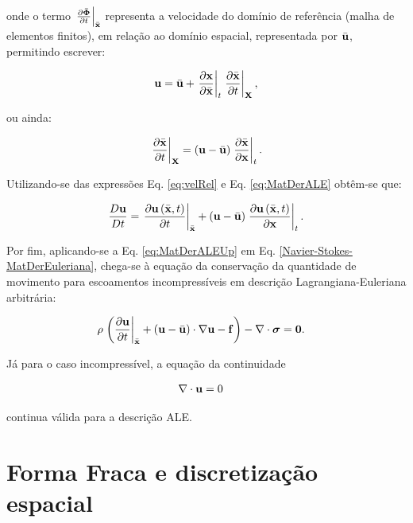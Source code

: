 \documentclass[tese_patricia]{subfiles}%
\begin{document}
\noindent onde o termo $\left. \frac{\partial \bar{\mathbf{\Phi}}}{\partial t} \right|_{\bar{\mathbf{x}}}$ representa a velocidade do domínio de referência (malha de elementos finitos), em relação ao domínio espacial, representada por $\bar{\mathbf{u}}$, permitindo escrever: 

\begin{align}
\mathbf{u} = \bar{\mathbf{u}} + \left . \frac{\partial \mathbf{x}}{\partial \bar{\mathbf{x}}} \right|_{t} \left . \frac{\partial \bar{\mathbf{x}}}{\partial t} \right|_{\mathbf{X}},
\end{align}

\noindent ou ainda:

\begin{align}
\left . \frac{\partial \bar{\mathbf{x}}}{\partial t} \right|_{\mathbf{X}} = \left( \mathbf{u} - \bar{\mathbf{u}} \right) \left. \frac{\partial \bar{\mathbf{x}}}{\partial \mathbf{x}} \right |_{t}. \label{eq:velRel}
 \end{align}
 
Utilizando-se das expressões Eq. \eqref{eq:velRel} e Eq. \eqref{eq:MatDerALE} obtêm-se que: 
 
\begin{align}
\frac{D\mathbf{u}}{Dt} = \left. \frac{\partial\mathbf{u}\left(\bar{\mathbf{x}},t\right)}{\partial t} \right|_{\bar{\mathbf{x}}} +  \left( \mathbf{u} - \bar{\mathbf{u}} \right) \left. \frac{\partial\mathbf{u}\left(\bar{\mathbf{x}},t\right)}{\partial \mathbf{x}} \right|_{t}. \label{eq:MatDerALEUp}
\end{align}

Por fim, aplicando-se a Eq. \eqref{eq:MatDerALEUp} em Eq. \ref{Navier-Stokes-MatDerEuleriana}, chega-se à equação da conservação da quantidade de movimento para escoamentos incompressíveis em descrição Lagrangiana-Euleriana arbitrária:

\begin{align}
\rho \left . \left(\frac{\partial\mathbf{u}}{\partial t} \right|_{\bar{\mathbf{x}}} + \left(\mathbf{u} - \bar{\mathbf{u}}\right)\cdot\nabla\mathbf{u} - \mathbf{f} \right) - \nabla \cdot \boldsymbol{\sigma} &= \mathbf{0}.  \label{eq:Navier-Stokes-ALE} 
\end{align}

Já para o caso incompressível, a equação da continuidade 

\begin{align}
\nabla \cdot \mathbf{u} &= 0 \label{eq:Continuity}
\end{align}

\noindent continua válida para a descrição ALE.


\section{Forma Fraca e discretização espacial} \label{capitulo:Cap2:FormaFraca}
\end{document}
